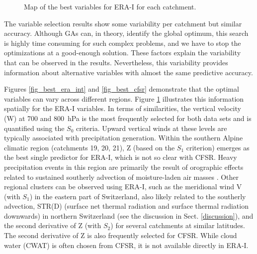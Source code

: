 \documentclass[draft]{agujournal2019}
\begin{document}
\begin{figure}[hbt]
	\noindent{}
	\caption{Map of the best variables for ERA-I for each catchment.}
	\label{fig_map_variables}
\end{figure}

The variable selection results show some variability per catchment but similar accuracy. Although GAs can, in theory, identify the global optimum, this search is highly time consuming for such complex problems, and we have to stop the optimizations at a good-enough solution. These factors explain the variability that can be observed in the results. Nevertheless, this variability provides information about alternative variables with almost the same predictive accuracy.

Figures \ref{fig_best_era_int} and \ref{fig_best_cfsr} demonstrate that the optimal variables can vary across different regions. Figure \ref{fig_map_variables} illustrates this information spatially for the ERA-I variables. In terms of similarities, the vertical velocity (W) at 700 and 800~hPa is the most frequently selected for both data sets and is quantified using the $S_{0}$ criteria. Upward vertical winds at these levels are typically associated with precipitation generation. Within the southern Alpine climatic region (catchments 19, 20, 21), Z (based on the $S_{1}$ criterion) emerges as the best single predictor for ERA-I, which is not so clear with CFSR. Heavy precipitation events in this region are primarily the result of orographic effects related to sustained southerly advection of moisture-laden air masses \cite{Massacand1998}. Other regional clusters can be observed using ERA-I, such as the meridional wind V (with $S_{1}$) in the eastern part of Switzerland, also likely related to the southerly advection, STR(D) (surface net thermal radiation and surface thermal radiation downwards) in northern Switzerland (see the discussion in Sect. \ref{discussion}), and the second derivative of Z (with $S_{2}$) for several catchments at similar latitudes. The second derivative of Z is also frequently selected for CFSR. While cloud water (CWAT) is often chosen from CFSR, it is not available directly in ERA-I.
\end{document}
